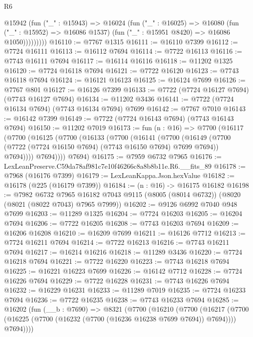 \begin{lexlean}{R6}
\begin{coremodule}
              @15942
                (fun ("_" : @15943) =>
                @16024
                  (fun ("_" : @16025) =>
                  @16080
                    (fun ("_" : @15952) => @16086 @1537)
                    (fun ("_" : @15951 @8420) => @16086 @1050)))))))))
@16110 := @7767 @1315
@16111 := @16110 @7399
@16112 := @7724 @16111
@16113 := @16112 @7694
@16114 := @7722 @16113
@16116 := @7743 @16111 @7694
@16117 := @16114 @16116
@16118 := @11202 @1325
@16120 := @7724 @16118 @7694
@16121 := @7722 @16120
@16123 := @7743 @16118 @7694
@16124 := @16121 @16123
@16125 := @16124 @7699
@16126 := @7767 @801
@16127 := @16126 @7399
@16133 := @7722 (@7724 @16127 @7694) (@7743 @16127 @7694)
@16134 := @11202 @3436
@16141 := @7722 (@7724 @16134 @7694) (@7743 @16134 @7694) @7699
@16142 := @7767 @7010
@16143 := @16142 @7399
@16149 := @7722 (@7724 @16143 @7694) (@7743 @16143 @7694)
@16150 := @11202 @7019
@16173 := fun (n : @16) =>
  @7700
    (@16117
      (@7700
        (@16125
          (@7700
            (@16133
              (@7700
                (@16141
                  (@7700
                    (@16149
                      (@7700 (@7722 (@7724 @16150 @7694) (@7743 @16150 @7694) @7699 @7694))
                      @7694))))
              @7694))))
      @7694)
@16175 := @7959 @6732 @7965
@16176 := LexLeanPreserve.C59da78af981c7e10f46266c8a8b8b11e.R6.__fits_89
@16178 := @7968 (@16176 @7399)
@16179 := LexLeanKappa.Json.hexValue
@16182 := @16178 (@225 (@16179 @7399))
@16184 := (n : @16) -> @16175 @16182
@16198 := @7982
    @6732
    @7965
    @16182
    @7043
    @9115
    (@8005 (@8014 @6732))
    (@8020 (@8021 (@8022 @7043) @7965 @7999))
@16202 := @9126 @6992 @7040 @948 @7699
@16203 := @11289 @1325
@16204 := @7724 @16203
@16205 := @16204 @7694
@16206 := @7722 @16205
@16208 := @7743 @16203 @7694
@16209 := @16206 @16208
@16210 := @16209 @7699
@16211 := @16126 @7712
@16213 := @7724 @16211 @7694
@16214 := @7722 @16213
@16216 := @7743 @16211 @7694
@16217 := @16214 @16216
@16218 := @11289 @3436
@16220 := @7724 @16218 @7694
@16221 := @7722 @16220
@16223 := @7743 @16218 @7694
@16225 := @16221 @16223 @7699
@16226 := @16142 @7712
@16228 := @7724 @16226 @7694
@16229 := @7722 @16228
@16231 := @7743 @16226 @7694
@16232 := @16229 @16231
@16233 := @11289 @7019
@16235 := @7724 @16233 @7694
@16236 := @7722 @16235
@16238 := @7743 @16233 @7694
@16285 := @16202
    (fun (__b : @7690) =>
    @8321
      (@7700
        (@16210
          (@7700
            (@16217
              (@7700 (@16225 (@7700 (@16232 (@7700 (@16236 @16238 @7699 @7694)) @7694))))
              @7694))))

\end{coremodule}
\end{lexlean}
